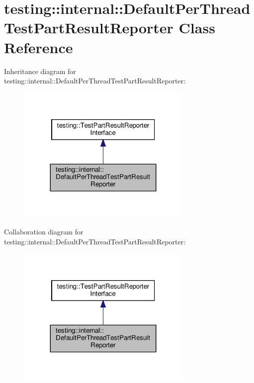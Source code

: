 \hypertarget{classtesting_1_1internal_1_1_default_per_thread_test_part_result_reporter}{}\section{testing\+:\+:internal\+:\+:Default\+Per\+Thread\+Test\+Part\+Result\+Reporter Class Reference}
\label{classtesting_1_1internal_1_1_default_per_thread_test_part_result_reporter}


Inheritance diagram for testing\+:\+:internal\+:\+:Default\+Per\+Thread\+Test\+Part\+Result\+Reporter\+:
\nopagebreak
\begin{figure}[H]
\begin{center}
\leavevmode
\includegraphics[width=239pt]{classtesting_1_1internal_1_1_default_per_thread_test_part_result_reporter__inherit__graph}
\end{center}
\end{figure}


Collaboration diagram for testing\+:\+:internal\+:\+:Default\+Per\+Thread\+Test\+Part\+Result\+Reporter\+:
\nopagebreak
\begin{figure}[H]
\begin{center}
\leavevmode
\includegraphics[width=239pt]{classtesting_1_1internal_1_1_default_per_thread_test_part_result_reporter__coll__graph}
\end{center}
\end{figure}
